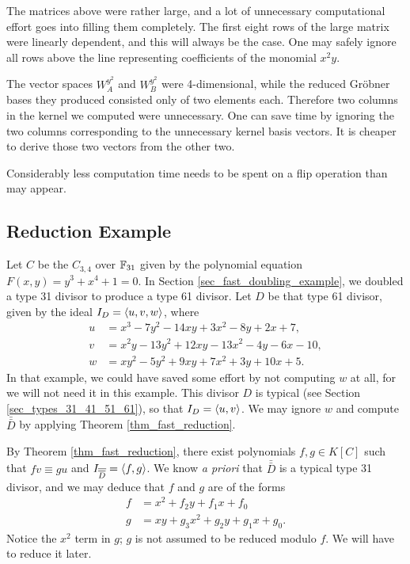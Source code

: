 \begin{remark}
  The matrices above were rather large,
  and a lot of unnecessary computational effort goes into filling them completely.
  The first eight rows of the large matrix were linearly dependent, and this will always be the case.
  One may safely ignore all rows above the line representing coefficients of the monomial $x^2y$.
  
  The vector spaces $W_A^{y^2}$ and $W_B^{y^2}$ were 4-dimensional,
  while the reduced Gr\"obner bases they produced consisted only of two elements each.
  Therefore two columns in the kernel we computed were unnecessary.
  One can save time by ignoring the two columns corresponding to the unnecessary kernel basis vectors.
  It is cheaper to derive those two vectors from the other two.
  
  Considerably less computation time needs to be spent on a flip operation than may appear.
\end{remark}




\subsection{Reduction Example}
\label{sec_reduction_example}

Let $C$ be the $C_{3,4}$ over $\mathbb{F}_{31}$ given by the polynomial equation $F(x,y) = y^3 + x^4 + 1 = 0$.
In Section \ref{sec_fast_doubling_example}, we doubled a type 31 divisor to produce a type 61 divisor.
Let $D$ be that type 61 divisor, given by the ideal $I_D = \left\langle u,v,w \right\rangle$, where
\begin{align*}
  u &=  x^3 -  7y^2 - 14xy +  3x^2 - 8y +  2x +  7, \\
  v &= x^2y - 13y^2 + 12xy - 13x^2 - 4y -  6x - 10, \\
  w &= xy^2 -  5y^2 +  9xy +  7x^2 + 3y + 10x +  5.
\end{align*}
In that example, we could have saved some effort by not computing $w$ at all, for we will not need it in this example.
This divisor $D$ is typical (see Section \ref{sec_types_31_41_51_61}), so that $I_D = \left\langle u,v \right\rangle$.
We may ignore $w$ and compute $\bar{\bar D}$ by applying Theorem \ref{thm_fast_reduction}.

By Theorem \ref{thm_fast_reduction},
there exist polynomials $f, g \in K[C]$ such that $fv \equiv gu$ and $I_{\overline{\overline D}} = \left\langle f,g \right\rangle$.
We know \emph{a priori} that $\bar{\bar D}$ is a typical type 31 divisor,
and we may deduce that $f$ and $g$ are of the forms
\begin{align*}
  f &= x^2 + f_2y + f_1x + f_0 \\
  g &= xy + g_3x^2 + g_2y + g_1x + g_0.
\end{align*}
Notice the $x^2$ term in $g$; $g$ is not assumed to be reduced modulo $f$.
We will have to reduce it later.

